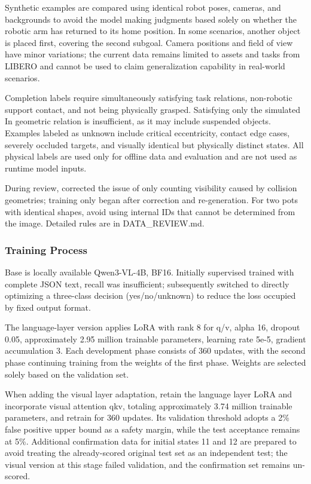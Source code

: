 Synthetic examples are compared using identical robot poses, cameras, and backgrounds to avoid the model making judgments based solely on whether the robotic arm has returned to its home position. In some scenarios, another object is placed first, covering the second subgoal. Camera positions and field of view have minor variations; the current data remains limited to assets and tasks from LIBERO and cannot be used to claim generalization capability in real-world scenarios.

Completion labels require simultaneously satisfying task relations, non-robotic support contact, and not being physically grasped. Satisfying only the simulated In geometric relation is insufficient, as it may include suspended objects. Examples labeled as unknown include critical eccentricity, contact edge cases, severely occluded targets, and visually identical but physically distinct states. All physical labels are used only for offline data and evaluation and are not used as runtime model inputs.

During review, corrected the issue of only counting visibility caused by collision geometries; training only began after correction and re-generation. For two pots with identical shapes, avoid using internal IDs that cannot be determined from the image. Detailed rules are in DATA\_REVIEW.md.

\subsubsection{Training Process}\label{s11-detail-10}

Base is locally available Qwen3-VL-4B, BF16. Initially supervised trained with complete JSON text, recall was insufficient; subsequently switched to directly optimizing a three-class decision (yes/no/unknown) to reduce the loss occupied by fixed output format.

The language-layer version applies LoRA with rank 8 for q/v, alpha 16, dropout 0.05, approximately 2.95 million trainable parameters, learning rate 5e-5, gradient accumulation 3. Each development phase consists of 360 updates, with the second phase continuing training from the weights of the first phase. Weights are selected solely based on the validation set.

When adding the visual layer adaptation, retain the language layer LoRA and incorporate visual attention qkv, totaling approximately 3.74 million trainable parameters, and retrain for 360 updates. Its validation threshold adopts a 2\% false positive upper bound as a safety margin, while the test acceptance remains at 5\%. Additional confirmation data for initial states 11 and 12 are prepared to avoid treating the already-scored original test set as an independent test; the visual version at this stage failed validation, and the confirmation set remains un-scored.


